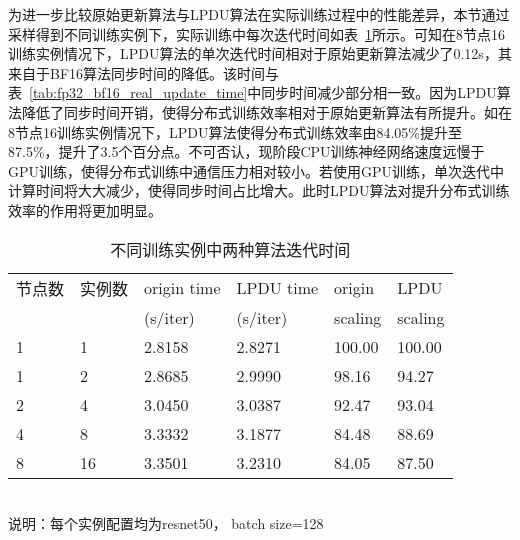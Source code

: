 为进一步比较原始更新算法与LPDU算法在实际训练过程中的性能差异，本节通过采样得到不同训练实例下，实际训练中每次迭代时间如表~\ref{tab:fp32_bf16_real_iter_time}所示。可知在8节点16训练实例情况下，LPDU算法的单次迭代时间相对于原始更新算法减少了0.12s，其来自于BF16算法同步时间的降低。该时间与表~\ref{tab:fp32_bf16_real_update_time}中同步时间减少部分相一致。因为LPDU算法降低了同步时间开销，使得分布式训练效率相对于原始更新算法有所提升。如在8节点16训练实例情况下，LPDU算法使得分布式训练效率由84.05\%提升至87.5\%，提升了3.5个百分点。不可否认，现阶段CPU训练神经网络速度远慢于GPU训练，使得分布式训练中通信压力相对较小。若使用GPU训练，单次迭代中计算时间将大大减少，使得同步时间占比增大。此时LPDU算法对提升分布式训练效率的作用将更加明显。

\begin{table}[htbp]
  \centering
  \caption{不同训练实例中两种算法迭代时间}
  \label{tab:fp32_bf16_real_iter_time}
  \begin{minipage}[t]{0.9\textwidth} 
    \begin{tabularx}{\linewidth}{|l|X|X|X|X|X|}
      \hline
      节点数 & 实例数 & origin time & LPDU time & origin & LPDU \\
       &  & (s/iter) & (s/iter) & scaling & scaling\\
      \hline
1 & 1 & 2.8158 & 2.8271 & 100.00 & 100.00 \\
1 & 2 & 2.8685 & 2.9990 & 98.16 & 94.27 \\
2 & 4 & 3.0450 & 3.0387 & 92.47 & 93.04 \\
4 & 8 & 3.3332 & 3.1877 & 84.48 & 88.69 \\
8 & 16 & 3.3501 & 3.2310 & 84.05 & 87.50 \\
      \hline
    \end{tabularx}\\[2pt]
    \footnotesize
    说明：每个实例配置均为resnet50， batch size=128\\
  \end{minipage}
\end{table}

